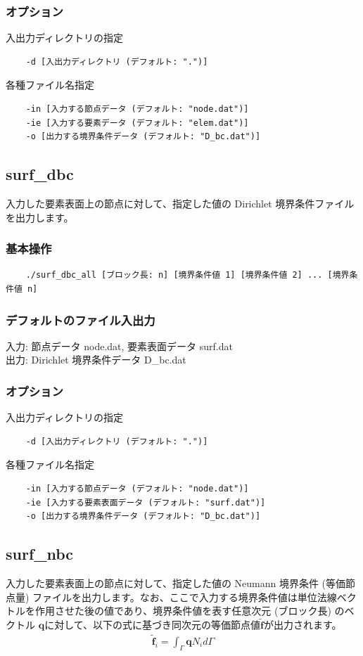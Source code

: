 \documentclass[8pt,a4paper]{article}
\newcommand{\bsm}{\boldsymbol}
\begin{document}
\subsubsection*{オプション}
入出力ディレクトリの指定
\begin{verbatim}
    -d [入出力ディレクトリ (デフォルト: ".")]
\end{verbatim}
各種ファイル名指定
\begin{verbatim}
    -in [入力する節点データ (デフォルト: "node.dat")]
    -ie [入力する要素データ (デフォルト: "elem.dat")]
    -o [出力する境界条件データ (デフォルト: "D_bc.dat")]
\end{verbatim}

\subsection{surf\_dbc}
入力した要素表面上の節点に対して、指定した値の Dirichlet 境界条件ファイルを出力します。
\subsubsection*{基本操作}
\begin{verbatim}
	./surf_dbc_all [ブロック長: n] [境界条件値 1] [境界条件値 2] ... [境界条件値 n]
\end{verbatim}

\subsubsection*{デフォルトのファイル入出力}
入力: 節点データ node.dat, 要素表面データ surf.dat \\ \noindent
出力: Dirichlet 境界条件データ D\_bc.dat

\subsubsection*{オプション}
入出力ディレクトリの指定
\begin{verbatim}
    -d [入出力ディレクトリ (デフォルト: ".")]
\end{verbatim}
各種ファイル名指定
\begin{verbatim}
    -in [入力する節点データ (デフォルト: "node.dat")]
    -ie [入力する要素表面データ (デフォルト: "surf.dat")]
    -o [出力する境界条件データ (デフォルト: "D_bc.dat")]
\end{verbatim}


\subsection{surf\_nbc}
入力した要素表面上の節点に対して、指定した値の Neumann 境界条件 (等価節点量) ファイルを出力します。なお、ここで入力する境界条件値は単位法線ベクトルを作用させた後の値であり、境界条件値を表す任意次元 (ブロック長) のベクトル $\bsm{q}$に対して、以下の式に基づき同次元の等価節点値$\tilde{\bsm{f}}$が出力されます。
\begin{align}
	\tilde{\bsm{f}}_i = \int_{\Gamma} \bsm{q} N_i d\Gamma
\end{align}
\end{document}

